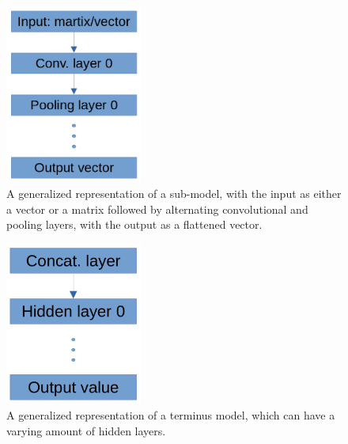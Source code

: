 \documentclass{article}
\begin{document}
			\begin{figure}[htbp]
				\begin{center}
					\includegraphics[width=0.4\textwidth]{images/submodel.png}
					\caption{A generalized representation of a sub-model, with the input as either
					a vector or a matrix followed by alternating convolutional and pooling layers,
					with the output as a flattened vector.}
					\label{fig:submodel}
				\end{center}
			\end{figure}
			\begin{figure}[htbp]
				\begin{center}
					\includegraphics[width=0.4\textwidth]{images/term_model.png}
					\caption{A generalized representation of a terminus model, which can have a
					varying amount of hidden layers.}
					\label{fig:term_model}
				\end{center}
			\end{figure}
\end{document}
